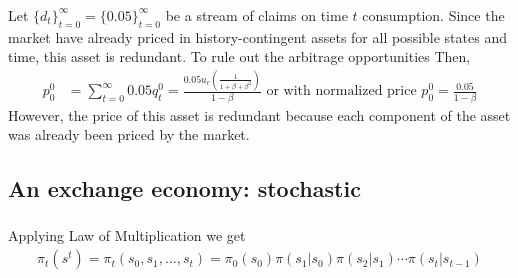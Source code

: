 \documentclass[]{article}
\begin{document}
\subsubsection{}
Let $\{d_t\}_{t = 0}^\infty = \{0.05\}_{t = 0}^\infty$ be a stream of claims on time $t$ consumption. Since the market have already priced in history-contingent assets for all possible states and time, this asset is redundant. To rule out the arbitrage opportunities Then,
\begin{equation}
	\begin{split}
		p_0^0& = \sum\limits_{t = 0}^\infty 0.05q_t^0 = \frac{0.05u_c(\frac{1}{1 + \beta + \beta^2})}{1 - \beta} \nonumber \text{ or with normalized price } p_0^0 = \frac{0.05}{1 - \beta}
	\end{split}
\end{equation}
However, the price of this asset is redundant because each component of the asset was already been priced by the market.

\subsection{An exchange economy: stochastic}
\subsubsection{}
Applying Law of Multiplication we get
\begin{equation}
	\begin{split}
		\pi_t(s^t) = \pi_t(s_0, s_1, ..., s_t) = \pi_0(s_0)\pi(s_1|s_0)\pi(s_2|s_1)\cdots\pi(s_t|s_{t-1}) \nonumber
	\end{split}
\end{equation}
\end{document}
